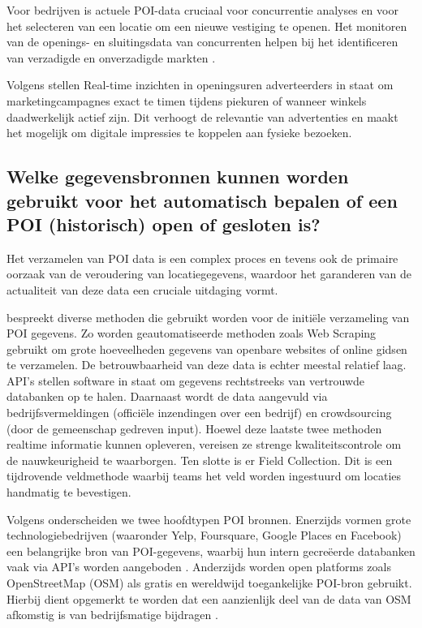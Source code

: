 Voor bedrijven is actuele POI-data cruciaal voor concurrentie analyses en voor het selecteren van een locatie om een nieuwe vestiging te openen. Het monitoren van de openings- en sluitingsdata van concurrenten helpen bij het identificeren van verzadigde en onverzadigde markten \autocite{Hoffman2026}.

Volgens \textcite{Anishma2025a} stellen Real-time inzichten in openingsuren adverteerders in staat om marketingcampagnes exact te timen tijdens piekuren of wanneer winkels daadwerkelijk actief zijn. Dit verhoogt de relevantie van advertenties en maakt het mogelijk om digitale impressies te koppelen aan fysieke bezoeken.

\subsection{Welke gegevensbronnen kunnen worden gebruikt voor het automatisch bepalen of een POI (historisch) open of gesloten is?}
\label{sec:gegevensbronnen}

Het verzamelen van POI data is een complex proces en tevens ook de primaire oorzaak van de veroudering van locatiegegevens, waardoor het garanderen van de actualiteit van deze data een cruciale uitdaging vormt.

\textcite{Anishma2025a} bespreekt diverse methoden die gebruikt worden voor de initiële verzameling van POI gegevens. Zo worden geautomatiseerde methoden zoals Web Scraping gebruikt om grote hoeveelheden gegevens van openbare websites of online gidsen te verzamelen. De betrouwbaarheid van deze data is echter meestal relatief laag. API's stellen software in staat om gegevens rechtstreeks van vertrouwde databanken op te halen. Daarnaast wordt de data aangevuld via bedrijfsvermeldingen (officiële inzendingen over een bedrijf) en crowdsourcing (door de gemeenschap gedreven input). Hoewel deze laatste twee methoden realtime informatie kunnen opleveren, vereisen ze strenge kwaliteitscontrole om de nauwkeurigheid te waarborgen. Ten slotte is er Field Collection. Dit is een tijdrovende veldmethode waarbij teams het veld worden ingestuurd om locaties handmatig te bevestigen.

Volgens \textcite{Psyllidis2022} onderscheiden we twee hoofdtypen POI bronnen. Enerzijds vormen grote technologiebedrijven (waaronder Yelp, Foursquare, Google Places en Facebook) een belangrijke bron van POI-gegevens, waarbij hun intern gecreëerde databanken vaak via API’s worden aangeboden \autocite{Psyllidis2022}. Anderzijds worden open platforms zoals OpenStreetMap (OSM) als gratis en wereldwijd toegankelijke POI-bron gebruikt. Hierbij dient opgemerkt te worden dat een aanzienlijk deel van de data van OSM afkomstig is van bedrijfsmatige bijdragen \autocite{Anderson2019}.

